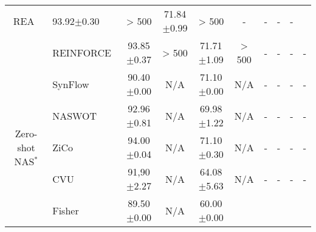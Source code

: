 \begin{table*}[t!]
\begin{center}
{\begin{tabular}{clcccccccc}
                        REA~\citep{real2019regularized} &
                        93.92\tiny$\pm$0.30 &
                        > 500 &
                        71.84\tiny$\pm$0.99 &
                        > 500 &
                        - &
                        - &
                        - &
                        - \\
                        &
                        REINFORCE~\citep{williams1992simple} &
                        93.85\tiny$\pm$0.37 &
                        > 500 &
                        71.71\tiny$\pm$1.09 &
                        > 500 &
                        - &
                        - &
                        - &
                        - \\
                        \midrule
                        \multicolumn{1}{c}{\multirow{5}{*}{Zero-shot NAS$^*$ }} &
                        SynFlow~\citep{tanaka2020pruning} &
                        90.40\tiny$\pm$0.00 &
                        N/A &
                        71.10\tiny$\pm$0.00 &
                        N/A &
                        - &
                        - &
                        - &
                        - \\
                        & 
                        NASWOT~\citep{mellor2021neural} &
                        92.96\tiny$\pm$0.81 &
                        N/A &
                        69.98\tiny$\pm$1.22 &
                        N/A &
                        - &
                        - &
                        - &
                        - \\
                        &
                        ZiCo~\citep{chen2021neural} &
                        94.00\tiny$\pm$0.04 &
                        N/A &
                        71.10\tiny$\pm$0.30 &
                        N/A &
                        - &
                        - &
                        - &
                        - \\
                        &
                        CVU~\citep{gracheva2021trainless} &
                        91,90\tiny$\pm$2.27 &
                        N/A &
                        64.08\tiny$\pm$5.63 &
                        N/A &
                        - &
                        - &
                        - &
                        - \\
                        &
                        Fisher~\citep{liu2021group} &
                        89.50\tiny$\pm$0.00 &
                        N/A &
                        60.00\tiny$\pm$0.00 &

\end{tabular}}
\end{center}
\end{table*}
